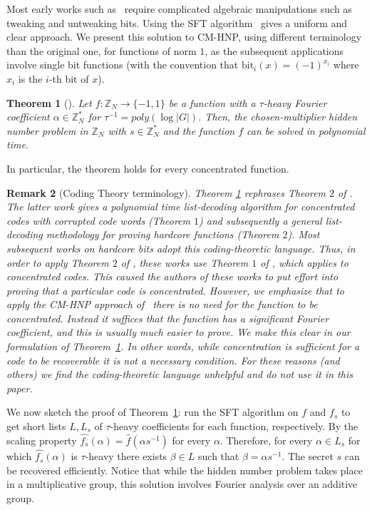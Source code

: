 \documentclass[11pt]{article}
\newtheorem{theorem}{Theorem}
\newtheorem{remark}[theorem]{Remark}
\theoremstyle{definition}
\newcommand{\Z}{\mathbb{Z}}
\newcommand{\bit}{\text{bit}}
\begin{document}
Most early works such as~\cite{ACGS,Bleichenbacher,HN} require complicated algebraic manipulations such as tweaking and untweaking bits. Using the SFT algorithm~\cite{AGS} gives a uniform and clear approach. We present this solution to CM-HNP, using different terminology than the original one, for functions of norm $1$, as the subsequent applications involve single bit functions (with the convention that $\bit_i(x) = (-1)^{x_i}$ where $x_i$ is the $i$-th bit of $x$).

\begin{theorem} [\cite{AGS}]
    \label{HNP_thm}
    Let $f: \Z_N \to \{-1,1\}$ be a function with a $\tau$-heavy Fourier coefficient $\alpha\in\Z^*_N$ for $\tau^{-1}=poly(\log|G|)$. Then, the chosen-multiplier hidden number problem in $\Z_N$ with $s \in \Z^*_N$ and the function $f$ can be solved in polynomial time.
\end{theorem}
In particular, the theorem holds for every concentrated function.

\begin{remark}[Coding Theory terminology]
    Theorem \ref{HNP_thm} rephrases Theorem $2$ of \cite{AGS}. The latter work gives a polynomial time list-decoding algorithm for \emph{concentrated codes} with corrupted code words (Theorem $1$) and subsequently a general list-decoding methodology for proving hardcore functions (Theorem $2$). Most subsequent works on hardcore bits adopt this coding-theoretic language.
    Thus, in order to apply Theorem $2$ of \cite{AGS}, these works use Theorem $1$ of \cite{AGS}, which applies to concentrated codes. This caused the authors of these works to put effort into proving that a particular code is concentrated. However, we emphasize that to apply the CM-HNP approach of~\cite{AGS} there is no need for the function to be concentrated.
    Instead it suffices that the function has a significant Fourier coefficient, and this is usually much easier to prove.
    We make this clear in our formulation of Theorem~\ref{HNP_thm}.
    In other words, while concentration is sufficient for a code to be \emph{recoverable} it is not a necessary condition.
    For these reasons (and others) we find the coding-theoretic language unhelpful and do not use it in this paper.
\end{remark}

We now sketch the proof of Theorem~\ref{HNP_thm}: run the SFT algorithm on $f$ and $f_s$ to get short lists $L,L_s$ of $\tau$-heavy coefficients for each function, respectively. By the scaling property $\widehat{f_s}(\alpha) = \widehat{f}(\alpha s^{-1})$ for every $\alpha$. Therefore, for every $\alpha \in L_s$ for which $\widehat{f_s}(\alpha)$ is $\tau$-heavy there exists $\beta \in L$ such that $\beta = \alpha s^{-1}$. The secret $s$ can be recovered efficiently. Notice that while the hidden number problem takes place in a multiplicative group, this solution involves Fourier analysis over an additive group.
\end{document}
